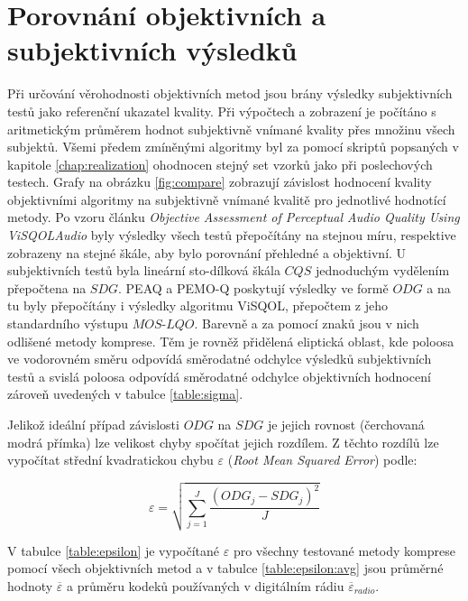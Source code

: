 \section{Porovnání objektivních a subjektivních výsledků}

Při určování věrohodnosti objektivních metod jsou brány výsledky subjektivních testů jako referenční ukazatel kvality. Při výpočtech a zobrazení je počítáno s aritmetickým průměrem hodnot subjektivně vnímané kvality přes množinu všech subjektů. Všemi předem zmíněnými algoritmy byl za pomocí skriptů popsaných v kapitole \ref{chap:realization} ohodnocen stejný set vzorků jako při poslechových testech. Grafy na obrázku \ref{fig:compare} zobrazují závislost hodnocení kvality objektivními algoritmy na subjektivně vnímané kvalitě pro jednotlivé hodnotící metody. Po vzoru článku \textit{Objective Assessment of Perceptual Audio Quality Using ViSQOLAudio} \cite{article:assessment} byly výsledky všech testů přepočítány na stejnou míru, respektive zobrazeny na stejné škále, aby bylo porovnání přehledné a objektivní. U subjektivních testů byla lineární sto-dílková škála $CQS$ jednoduchým vydělením přepočtena na $SDG$. PEAQ a PEMO-Q poskytují výsledky ve formě $ODG$ a na tu byly přepočítány i výsledky algoritmu ViSQOL, přepočtem z jeho standardního výstupu $MOS\text{-}LQO$. Barevně a za pomocí znaků jsou v nich odlišené metody komprese. Těm je rovněž přidělená eliptická oblast, kde poloosa ve vodorovném směru odpovídá směrodatné odchylce výsledků subjektivních testů a svislá poloosa odpovídá směrodatné odchylce objektivních hodnocení zároveň uvedených v tabulce \ref{table:sigma}. 

Jelikož ideální případ závislosti $ODG$ na $SDG$ je jejich rovnost (čerchovaná modrá přímka) lze velikost chyby spočítat jejich rozdílem. Z těchto rozdílů lze vypočítat střední kvadratickou chybu $\varepsilon$ (\textit{Root Mean Squared Error}) podle:

\begin{equation}
    {\varepsilon} = \sqrt{\sum_{j=1}^{J}\frac{({ODG_j}-{SDG_j})^2}{J}}
\end{equation}

V tabulce \ref{table:epsilon} je vypočítané $\varepsilon$ pro všechny testované metody komprese pomocí všech objektivních metod a v tabulce \ref{table:epsilon:avg} jsou průměrné hodnoty $\overline{\varepsilon}$ a průměru kodeků používaných v digitálním rádiu $\overline{\varepsilon}_{radio}$.


